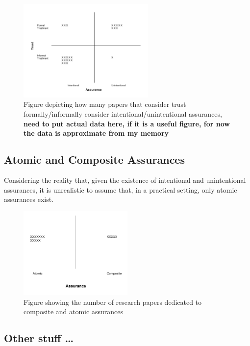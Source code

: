 	\begin{figure}[htbp]
    	\centering
     	\includegraphics[width=0.6\textwidth]{Figures/Trust_vs_Assurance_Intention.pdf}
    	\caption{Figure depicting how many papers that consider trust formally/informally consider intentional/unintentional assurances, \textbf{need to put actual data here, if it is a useful figure, for now the data is approximate from my memory}}
        \label{fig:trust_assurance_intention}
    \end{figure}

\subsection{Atomic and Composite Assurances}
    Considering the reality that, given the existence of intentional and unintentional assurances, it is unrealistic to assume that, in a practical setting, only atomic assurances exist.

	\begin{figure}[htbp]
    	\centering
     	\includegraphics[width=0.5\textwidth]{Figures/Assurances_atomic_composite.pdf}
    	\caption{Figure showing the number of research papers dedicated to composite and atomic assurances}
        \label{fig:trust_assurance_intention}
    \end{figure}


\subsection{Other stuff \ldots}
